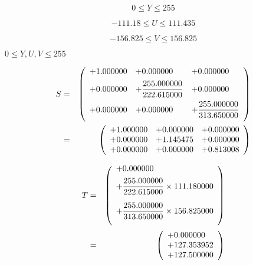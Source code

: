 \documentclass{article}
\begin{document}
\[ 0 \le Y \le 255 \]
\pagebreak

\[ -111.18 \le U \le 111.435 \]
\pagebreak

\[ -156.825 \le V \le 156.825 \]
\pagebreak

$ 0 \le Y, U, V \le 255 $
\pagebreak

\begin{eqnarray*} S &=& \left( \begin{array}{lll} +1.000000 & +0.000000 & +0.000000 \vspace{.5em} \\ +0.000000 & +\dfrac{255.000000}{222.615000} & +0.000000 \vspace{.5em} \\ +0.000000 & +0.000000 & +\dfrac{255.000000}{313.650000} \vspace{.5em} \\ \end{array} \right) \\ &=& \left( \begin{array}{lll} +1.000000 & +0.000000 & +0.000000 \\ +0.000000 & +1.145475 & +0.000000 \\ +0.000000 & +0.000000 & +0.813008 \\ \end{array} \right) \\ \end{eqnarray*}
\pagebreak

\begin{eqnarray*} T &=& \left( \begin{array}{l} +0.000000 \vspace{.5em} \\ +\dfrac{255.000000}{222.615000} \times 111.180000 \vspace{.5em} \vspace{.5em} \\ +\dfrac{255.000000}{313.650000} \times 156.825000 \vspace{.5em} \vspace{.5em} \\ \end{array} \right) \\ &=& \left( \begin{array}{lll} +0.000000 \\ +127.353952 \\ +127.500000 \\ \end{array} \right)\\ \end{eqnarray*}
\pagebreak
\end{document}
